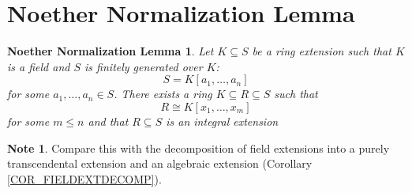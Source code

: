 \documentclass[12pt, letterpaper, oneside]{article}
\theoremstyle{plain}
\newtheorem{NNL}[theorem]{Noether Normalization Lemma}
\theoremstyle{definition}
\newtheorem{note}[theorem]{Note}
\newcommand{\vs}{\vskip 5mm}
\begin{document}
\newpage
\section{Noether Normalization Lemma}
\label{SEC_NOETHNORM}





\begin{NNL}
\label{THM_NOETHNORM}
Let $K\subseteq S$ be a ring extension such that $K$ is a field and $S$ is  
finitely generated over $K$: 
$$S= K[a_{1}, \dots, a_{n}]$$
for some $a_{1}, \dots, a_{n}\in S$. There exists a ring $K\subseteq R \subseteq S$ such that 
$$R\cong K[x_{1}, \dots, x_{m}]$$
for some $m\leq n$ and that $R\subseteq S$ is an integral extension
\end{NNL}

\vs\vs

\begin{note}
Compare this with the decomposition of field extensions into a purely transcendental 
extension and an algebraic extension (Corollary \ref{COR_FIELDEXTDECOMP}).
\end{note}

\vs\vs
\end{document}
